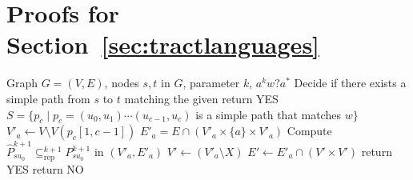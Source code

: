 \documentclass[a4paper,english]{lipics-v2016}
\theoremstyle{plain}
\begin{document}
 
\makeatletter{}\section{Proofs for Section~\ref{sec:tractlanguages}}

\begin{algorithm}[t]
\caption{}\begin{algorithmic}[1]
\Require Graph $G=(V,E)$, nodes $s,t$ in $G$, parameter $k$, \re $a^kw?a^*$
\Ensure Decide if there exists a simple path from $s$ to $t$ matching the given \re
{} return
YES  \label{alg:b?fptalg:1} 
\EndIf
\State $S = \{p_c \mid p_c=(u_0,u_1)\cdots (u_{c-1},u_c)$ is a simple
path that matches $w\}$
 \label{alg:b?fptalg:3} 
\State $V'_a \gets V \setminus V(p_c[1,c-1])$ 
\State $E'_a = E \cap (V'_a \times \{a\} \times V'_a)$ 
\State Compute $\hat{P}^{k+1}_{su_0} \subseteq^{k+1}_\text{rep} P^{k+1}_{su_0}$ in $(V'_a,E'_a)$ \label{alg:b?fptalg:7} 
 \label{alg:b?fptalg:8} 
\State $V' \gets (V'_a \setminus X)$
\State $E' \gets E'_a \cap (V' \times V')$
\State return YES
\EndIf
\EndFor
\EndFor
\State return NO
\end{algorithmic}
\label{b?fptalg}
\end{algorithm} 
\end{document}
